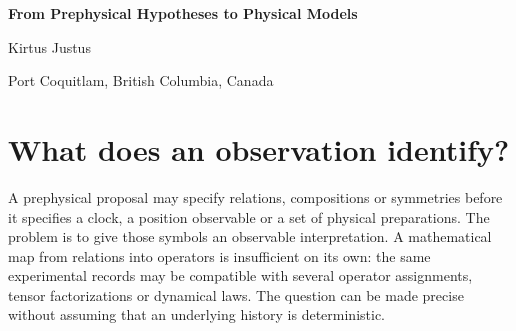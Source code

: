 \documentclass[11pt,letterpaper]{article}
\begin{document}
\thispagestyle{plain}

\begin{center}{\Large\bfseries\sffamily\color{ink}From Prephysical Hypotheses to Physical Models}\par\vspace{10pt}
{\large Kirtus Justus}\par Port Coquitlam, British Columbia, Canada\end{center}
\begin{abstract}
What would justify interpreting a relational structure as a physical one? We study the part of this question that admits an operational answer: which properties are shared by every model consistent with specified preparations, interventions and measurements? Finite operator algebras illustrate when invariant rank-one choices exist. Spectral filters show how calibrated port measurements can recover a graph, while a static projector or a finite list of moments can leave its generating dynamics ambiguous. Fermionic relative entropy and a scalar-field response illustrate how a physical model and its scale enter such comparisons. For a finite-dimensional instrument, we determine the greatest possible weight of its operation in a specified local operator subspace from all basis-input first-output marginals. For every finite discarded dimension of at least two, joint purification gives the attainable ceiling and zero remains possible. Reading the second output label can give a positive lower bound. Matched coherent preparations and output projections can determine the weight even when all basis outputs leave it ambiguous. We construct both endpoints for each observation class and give an all-attempt sequential test for the calibrated four-input model. The results specify what each observation determines and which calibration would make the inference applicable to a particular physical system.
\end{abstract}

\section{What does an observation identify?}\label{sec:obs}

A prephysical proposal may specify relations, compositions or symmetries before it specifies a clock, a position observable or a set of physical preparations. The problem is to give those symbols an observable interpretation. A mathematical map from relations into operators is insufficient on its own: the same experimental records may be compatible with several operator assignments, tensor factorizations or dynamical laws. The question can be made precise without assuming that an underlying history is deterministic.
\end{document}
